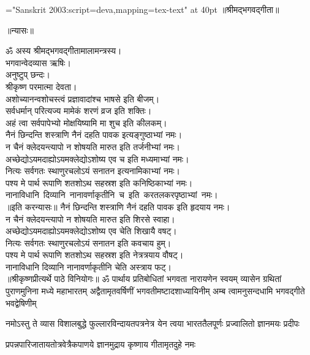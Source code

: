 \large
\centerline{\font\x="Sanskrit 2003:script=deva,mapping=tex-text" at 40pt \x ॥श्रीमद्भगवद्गीता॥}
\bigskip
\centerline{\Large ॥न्यासः॥}
\medskip
{}
ॐ अस्य श्रीमद्‌भगवद्‌गीतामालामन्त्रस्य।\\ 
भगवान्वेदव्यास ऋषिः।\\
अनुष्टुप्‌ छन्दः।\\
श्रीकृष्ण परमात्मा देवता।\\
अशोच्यानन्वशोचस्त्वं प्रज्ञावादांश्च भाषसे इति बीजम्‌।\\
सर्वधर्मान्‌ परित्यज्य मामेकं शरणं व्रज इति शक्तिः।\\
अहं त्वा सर्वपापेभ्यो मोक्षयिष्यामि मा शुच इति कीलकम्‌।\\
नैनं छिन्दन्ति शस्त्राणि नैनं दहति पावक इत्यङ्गुष्ठाभ्यां नमः।\\
न चैनं क्लेदयन्त्यापो न शोषयति मारुत इति तर्जनीभ्यां नमः।\\
अच्छेद्योऽयमदाह्योऽयमक्लेद्योऽशोष्य एव च इति मध्यमाभ्यां नमः।\\
नित्यः सर्वगतः स्थाणुरचलोऽयं सनातन इत्यनामिकाभ्यां नमः।\\
पश्य मे पार्थ रूपाणि शतशोऽथ सहस्रश इति कनिष्ठिकाभ्यां नमः।\\
नानाविधानि~दिव्यानि~नानावर्णाकृतीनि~च~इति~करतलकरपृष्ठाभ्यां~नमः।\\
{॥इति करन्यासः॥}
\medskip
\newpage
{}
नैनं छिन्दन्ति शस्त्राणि नैनं दहति पावक इति हृदयाय नमः।\\
न चैनं क्लेदयन्त्यापो न शोषयति मारुत इति शिरसे स्वाहा।\\
अच्छेद्योऽयमदाह्योऽयमक्लेद्योऽशोष्य एव चेति शिखायै वषट्‌।\\
नित्यः सर्वगतः स्थाणुरचलोऽयं सनातन इति कवचाय हुम्‌।\\
पश्य मे पार्थ रूपाणि शतशोऽथ सहस्रश इति नेत्रत्रयाय वौषट्‌।\\
नानाविधानि दिव्यानि नानावर्णाकृतीनि चेति अस्त्राय फट्‌।\\
{॥श्रीकृष्णप्रीत्यर्थे पाठे विनियोगः॥}
{}
\fourlineindentedshloka
{ॐ पार्थाय प्रतिबोधितां भगवता नारायणेन स्वयम्}
{व्यासेन ग्रथितां पुराणमुनिना मध्ये महाभारतम्}
{अद्वैतामृतवर्षिणीं भगवतीमष्टादशाध्यायिनीम्}
{अम्ब त्वामनुसन्दधामि भगवद्गीते भवद्वेषिणीम्}%

\twolineshloka
{नमोऽस्तु ते व्यास विशालबुद्धे फुल्लारविन्दायतपत्रनेत्र}
{येन त्वया भारततैलपूर्णः प्रज्वालितो ज्ञानमयः प्रदीपः}%

\twolineshloka
{प्रपन्नपारिजातायतोत्रवेत्रैकपाणये}
{ज्ञानमुद्राय कृष्णाय गीतामृतदुहे नमः}%

